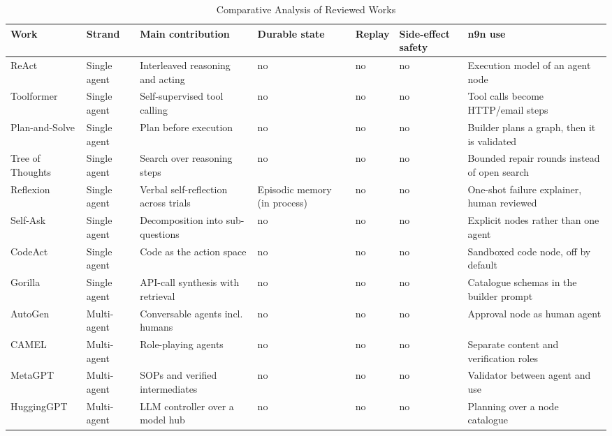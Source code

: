 \documentclass[conference]{IEEEtran}
\begin{document}
\begin{table}[!t]
\centering
\caption{Comparative Analysis of Reviewed Works}
\label{tab:compare}
\small
\begin{tabular}{L{2.3cm} L{1.5cm} L{3.4cm} L{1.4cm} L{1.3cm} L{1.7cm} L{3.3cm}}
\toprule
\textbf{Work} & \textbf{Strand} & \textbf{Main contribution} & \textbf{Durable state} & \textbf{Replay} & \textbf{Side-effect safety} & \textbf{n9n use} \\
\midrule
ReAct \cite{yao2023react} & Single agent & Interleaved reasoning and acting & no & no & no & Execution model of an agent node \\
Toolformer \cite{schick2023toolformer} & Single agent & Self-supervised tool calling & no & no & no & Tool calls become HTTP/email steps \\
Plan-and-Solve \cite{wang2023plansolve} & Single agent & Plan before execution & no & no & no & Builder plans a graph, then it is validated \\
Tree of Thoughts \cite{yao2023tot} & Single agent & Search over reasoning steps & no & no & no & Bounded repair rounds instead of open search \\
Reflexion \cite{shinn2023reflexion} & Single agent & Verbal self-reflection across trials & Episodic memory (in process) & no & no & One-shot failure explainer, human reviewed \\
Self-Ask \cite{press2023selfask} & Single agent & Decomposition into sub-questions & no & no & no & Explicit nodes rather than one agent \\
CodeAct \cite{wang2024codeact} & Single agent & Code as the action space & no & no & no & Sandboxed code node, off by default \\
Gorilla \cite{patil2023gorilla} & Single agent & API-call synthesis with retrieval & no & no & no & Catalogue schemas in the builder prompt \\
AutoGen \cite{wu2023autogen} & Multi-agent & Conversable agents incl. humans & no & no & no & Approval node as human agent \\
CAMEL \cite{li2023camel} & Multi-agent & Role-playing agents & no & no & no & Separate content and verification roles \\
MetaGPT \cite{hong2023metagpt} & Multi-agent & SOPs and verified intermediates & no & no & no & Validator between agent and use \\
HuggingGPT \cite{shen2023hugginggpt} & Multi-agent & LLM controller over a model hub & no & no & no & Planning over a node catalogue \\

\end{tabular}
\end{table}
\end{document}
